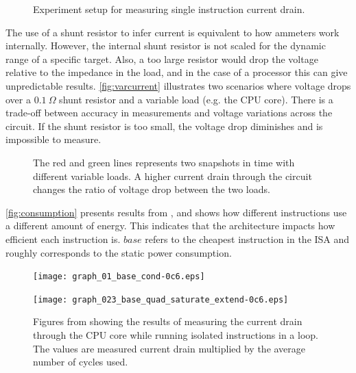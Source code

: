 \begin{figure}[bth]
    \centering
    
    \caption{Experiment setup for measuring single instruction current drain.}
    \label{fig:setup}
\end{figure}

The use of a shunt resistor to infer current is equivalent to how ammeters work
internally. However, the internal shunt resistor is not scaled for the dynamic
range of a specific target. Also, a too large resistor would drop the voltage
relative to the impedance in the load, and in the case of a processor this can
give unpredictable results. \autoref{fig:varcurrent} illustrates two scenarios
where voltage drops over a $0.1~\Omega$ shunt resistor and a variable load (e.g.
the CPU core). There is a trade-off between accuracy in measurements and voltage
variations across the circuit. If the shunt resistor is too small, the voltage
drop diminishes and is impossible to measure.

\begin{figure}[tbh]
    \centering
    
    \caption{The red and green lines represents two snapshots in time with
    different variable loads. A higher current drain through the circuit
    changes the ratio of voltage drop between the two loads.}
    \label{fig:varcurrent}
\end{figure}

\autoref{fig:consumption} presents results from \cite{rundehvatum2013exploring},
and shows how different instructions use a different amount of energy. This
indicates that the architecture impacts how efficient each instruction is.
$base$ refers to the cheapest instruction in the ISA and roughly corresponds to
the static power consumption.

\begin{figure}
    \begin{minipage}[b]{0.48\textwidth}
        \texttt{[image: graph\_01\_base\_cond-0c6.eps]}
        \label{fig:consumptioncond}
    \end{minipage}
    \begin{minipage}[b]{0.52\textwidth}
        \texttt{[image: graph\_023\_base\_quad\_saturate\_extend-0c6.eps]}
        \label{fig:consumptionmulti}
    \end{minipage}
    \caption{Figures from \cite{rundehvatum2013exploring} showing the results of
        measuring the current drain through the CPU core while running isolated
        instructions in a loop. The values are measured current drain multiplied
        by the average number of cycles used.}
    \label{fig:consumption}
\end{figure}


